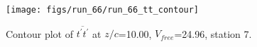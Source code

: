 \begin{figure}[H]
\centering
\texttt{[image: figs/run\_66/run\_66\_tt\_contour]}
\caption{Contour plot of $\overline{t^\prime t^\prime}$ at $z/c$=10.00, $V_{free}$=24.96, station 7.}
\label{fig:run_66_tt_contour}
\end{figure}



